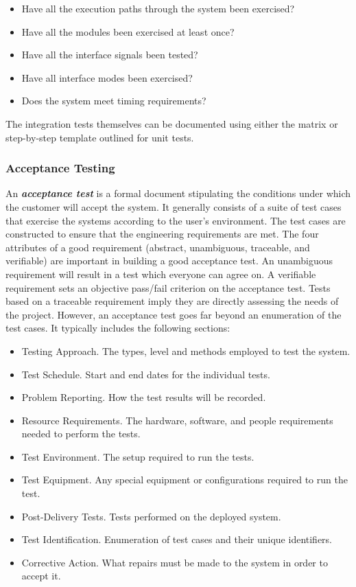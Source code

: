 \begin{itemize}
\item
  Have all the execution paths through the system been exercised?
\item
  Have all the modules been exercised at least once?
\item
  Have all the interface signals been tested?
\item
  Have all interface modes been exercised?
\item
  Does the system meet timing requirements?
\end{itemize}

The integration tests themselves can be documented using either the
matrix or step-by-step template outlined for unit tests.

\subsubsection{Acceptance Testing}\label{acceptance-testing}

An \emph{\textbf{acceptance test}} is a formal document stipulating the
conditions under which the customer will accept the system. It generally
consists of a suite of test cases that exercise the systems according to
the user's environment. The test cases are constructed to ensure that
the engineering requirements are met. The four attributes of a good
requirement (abstract, unambiguous, traceable, and verifiable) are
important in building a good acceptance test. An unambiguous requirement
will result in a test which everyone can agree on. A verifiable
requirement sets an objective pass/fail criterion on the acceptance
test. Tests based on a traceable requirement imply they are directly
assessing the needs of the project. However, an acceptance test goes far
beyond an enumeration of the test cases. It typically includes the
following sections:

\begin{itemize}
\item
  Testing Approach. The types, level and methods employed to test the
  system.
\item
  Test Schedule. Start and end dates for the individual tests.
\item
  Problem Reporting. How the test results will be recorded.
\item
  Resource Requirements. The hardware, software, and people requirements
  needed to perform the tests.
\item
  Test Environment. The setup required to run the tests.
\item
  Test Equipment. Any special equipment or configurations required to
  run the test.
\item
  Post-Delivery Tests. Tests performed on the deployed system.
\item
  Test Identification. Enumeration of test cases and their unique
  identifiers.
\item
  Corrective Action. What repairs must be made to the system in order to
  accept it.
\end{itemize}

